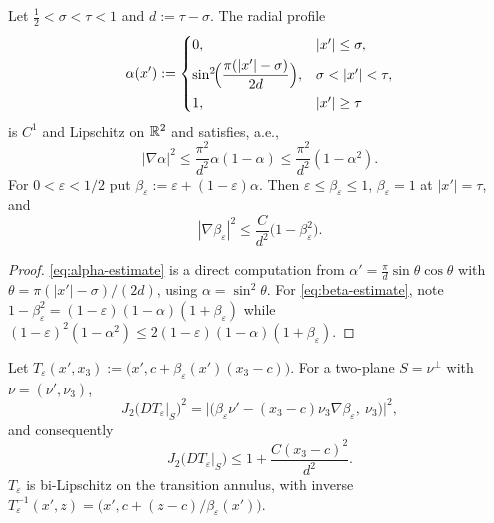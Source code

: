 \begin{lemma}\label{lem:compression-profile}
Let $\tfrac12<\sigma<\tau<1$ and $d:=\tau-\sigma$.  The radial profile
\begin{equation}\label{eq:alpha-profile}
  \alpha(x'):=
  \begin{cases}
    0,&|x'|\le\sigma,\\[1mm]
    \sin^2\!\Bigl(\dfrac{\pi(|x'|-\sigma)}{2d}\Bigr),&\sigma<|x'|<\tau,\\[2mm]
    1,&|x'|\ge\tau
  \end{cases}
\end{equation}
is $C^1$ and Lipschitz on $\mathbb R^2$ and satisfies, a.e.,
\begin{equation}\label{eq:alpha-estimate}
  |\nabla\alpha|^2\le\frac{\pi^2}{d^2}\alpha(1-\alpha)
  \le\frac{\pi^2}{d^2}(1-\alpha^2).
\end{equation}
For $0<\varepsilon<1/2$ put
$\beta_\varepsilon:=\varepsilon+(1-\varepsilon)\alpha$.  Then
$\varepsilon\le\beta_\varepsilon\le1$, $\beta_\varepsilon=1$ at
$|x'|=\tau$, and
\begin{equation}\label{eq:beta-estimate}
  |\nabla\beta_\varepsilon|^2\le\frac{C}{d^2}\bigl(1-\beta_\varepsilon^2\bigr).
\end{equation}
\end{lemma}

\begin{proof}
\eqref{eq:alpha-estimate} is a direct computation from
$\alpha'=\tfrac{\pi}{d}\sin\theta\cos\theta$ with
$\theta=\pi(|x'|-\sigma)/(2d)$, using $\alpha=\sin^2\theta$.  For
\eqref{eq:beta-estimate}, note
$1-\beta_\varepsilon^2=(1-\varepsilon)(1-\alpha)(1+\beta_\varepsilon)$ while
$(1-\varepsilon)^2(1-\alpha^2)\le2(1-\varepsilon)(1-\alpha)(1+\beta_\varepsilon)$.
\end{proof}

\begin{lemma}\label{lem:compression-jacobian}
Let $T_\varepsilon(x',x_3):=\bigl(x',c+\beta_\varepsilon(x')(x_3-c)\bigr)$.
For a two-plane $S=\nu^\perp$ with $\nu=(\nu',\nu_3)$,
\begin{equation}\label{eq:compression-cofactor}
  J_2\bigl(DT_\varepsilon|_S\bigr)^2
  =\bigl|\bigl(\beta_\varepsilon\nu'
    -(x_3-c)\nu_3\nabla\beta_\varepsilon,\ \nu_3\bigr)\bigr|^2 ,
\end{equation}
and consequently
\begin{equation}\label{eq:compression-jacobian}
  J_2\bigl(DT_\varepsilon|_S\bigr)\le1+\frac{C(x_3-c)^2}{d^2}.
\end{equation}
$T_\varepsilon$ is bi-Lipschitz on the transition annulus, with inverse
$T_\varepsilon^{-1}(x',z)=\bigl(x',c+(z-c)/\beta_\varepsilon(x')\bigr)$.
\end{lemma}

